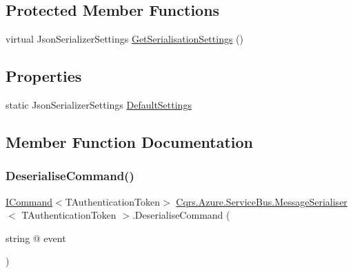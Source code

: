 \subsection*{Protected Member Functions}
\begin{DoxyCompactItemize}
\item 
virtual Json\+Serializer\+Settings \hyperlink{classCqrs_1_1Azure_1_1ServiceBus_1_1MessageSerialiser_aca8f19355749092a6ad7b5085dc7f057_aca8f19355749092a6ad7b5085dc7f057}{Get\+Serialisation\+Settings} ()
\end{DoxyCompactItemize}
\subsection*{Properties}
\begin{DoxyCompactItemize}
\item 
static Json\+Serializer\+Settings \hyperlink{classCqrs_1_1Azure_1_1ServiceBus_1_1MessageSerialiser_a71ebae2d4d6352b19b49bd0115b99fcf_a71ebae2d4d6352b19b49bd0115b99fcf}{Default\+Settings}
\end{DoxyCompactItemize}


\subsection{Member Function Documentation}
\mbox{\label{classCqrs_1_1Azure_1_1ServiceBus_1_1MessageSerialiser_a7cbab381f4758f8dd04cd17e2c5f2c3a_a7cbab381f4758f8dd04cd17e2c5f2c3a}} 
\subsubsection{\texorpdfstring{Deserialise\+Command()}{DeserialiseCommand()}}
{\footnotesize\ttfamily \hyperlink{interfaceCqrs_1_1Commands_1_1ICommand}{I\+Command}$<$T\+Authentication\+Token$>$ \hyperlink{classCqrs_1_1Azure_1_1ServiceBus_1_1MessageSerialiser}{Cqrs.\+Azure.\+Service\+Bus.\+Message\+Serialiser}$<$ T\+Authentication\+Token $>$.Deserialise\+Command (\begin{DoxyParamCaption}\item[{string @}]{event }\end{DoxyParamCaption})}



